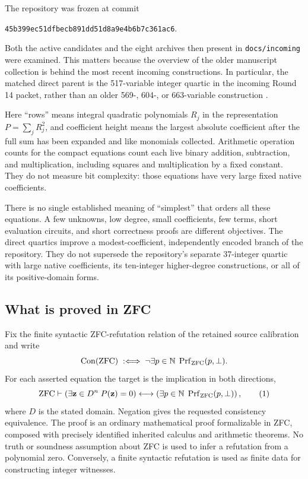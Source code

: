 \documentclass[11pt]{article}
\newcommand{\Con}{\operatorname{Con}}\newcommand{\ZFC}{\mathrm{ZFC}}
\newcommand{\file}[1]{\nolinkurl{#1}}
\theoremstyle{definition}\newtheorem{definition}[theorem]{Definition}
\theoremstyle{remark}\newtheorem{remark}[theorem]{Remark}
\begin{document}
The repository was frozen at commit
\begin{center}\small\file{45b399ec51dfbecb891dd51d8a9e4b6b7c361ac6}.\end{center}
Both the active candidates and the eight archives then present in
\file{docs/incoming} were examined. This matters because the overview of the
older manuscript collection is behind the most recent incoming constructions.
In particular, the matched direct parent is the 517-variable integer quartic
in the incoming Round 14 packet, rather than an older 569-, 604-, or
663-variable construction \cite{round14,repo}.



Here ``rows'' means integral quadratic polynomials $R_j$ in the representation
$P=\sum_j R_j^2$, and coefficient height means the largest absolute coefficient
after the full sum has been expanded and like monomials collected. Arithmetic
operation counts for the compact equations count each live binary addition,
subtraction, and multiplication, including squares and multiplication by a
fixed constant. They do not measure bit complexity: those equations have very
large fixed native coefficients.

There is no single established meaning of ``simplest'' that orders all these
equations. A few unknowns, low degree, small coefficients, few terms, short
evaluation circuits, and short correctness proofs are different objectives.
The direct quartics improve a modest-coefficient, independently encoded branch
of the repository. They do not supersede the repository's separate
37-integer quartic with large native coefficients, its ten-integer
higher-degree constructions, or all of its positive-domain forms.

\subsection{What is proved in ZFC}
Fix the finite syntactic ZFC-refutation relation of the retained source
calibration and write
\[
 \Con(\ZFC)\;:\Longleftrightarrow\;
 \neg\exists p\in\N\;\operatorname{Prf}_{\ZFC}(p,\bot).
\]
For each asserted equation the target is the implication in both directions,
\[
 \ZFC\vdash
 \left(\exists\mathbf z\in D^n\;P(\mathbf z)=0\right)
 \longleftrightarrow
 \left(\exists p\in\N\;\operatorname{Prf}_{\ZFC}(p,\bot)\right),
 \tag{1}\label{eq:target}
\]
where $D$ is the stated domain. Negation gives the requested consistency
equivalence. The proof is an ordinary mathematical proof formalizable in ZFC,
composed with precisely identified inherited calculus and arithmetic theorems.
No truth or soundness assumption about ZFC is used to infer a refutation from a
polynomial zero. Conversely, a finite syntactic refutation is used as finite
data for constructing integer witnesses.
\end{document}
